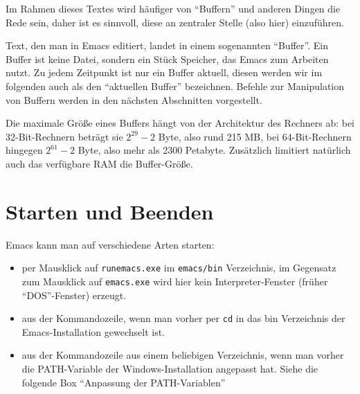 \documentclass[12pt,ngerman]{scrbook}
\begin{document}
Im Rahmen dieses Textes wird häufiger von \enquote{Buffern} und anderen Dingen die Rede sein, daher ist es sinnvoll, diese an zentraler Stelle (also hier) einzuführen.

Text, den man in Emacs editiert, landet in einem sogenannten \enquote{Buffer}. Ein Buffer ist keine Datei, sondern ein Stück Speicher, das Emacs zum Arbeiten nutzt. Zu jedem Zeitpunkt ist nur ein Buffer aktuell, diesen werden wir im folgenden auch als den \enquote{aktuellen Buffer} bezeichnen. Befehle zur Manipulation von Buffern werden in den nächsten Abschnitten vorgestellt.

Die maximale Größe eines Buffers hängt von der Architektur des Rechners ab: bei 32-Bit-Rechnern beträgt sie $2^29 - 2$ Byte, also rund 215 MB, bei 64-Bit-Rechnern hingegen $2^61-2$ Byte, also mehr als 2300 Petabyte. Zusätzlich limitiert natürlich auch das verfügbare RAM die Buffer-Größe.

\section{Starten und Beenden}

Emacs kann man auf verschiedene Arten starten:

\begin{itemize}
	\item per Mausklick auf \texttt{runemacs.exe} im \texttt{emacs/bin} Verzeichnis, im Gegensatz zum Mausklick auf \texttt{emacs.exe} wird hier kein Interpreter-Fenster (früher \enquote{DOS}-Fenster) erzeugt.
	\item aus der Kommandozeile, wenn man vorher per \texttt{cd} in das bin Verzeichnis der Emacs-Installation gewechselt ist. 
	\item aus der Kommandozeile aus einem beliebigen Verzeichnis, wenn man vorher die PATH-Variable der Windows-Installation angepasst hat. Siehe die folgende Box \enquote{Anpassung der PATH-Variablen}
\end{itemize}
\end{document}
